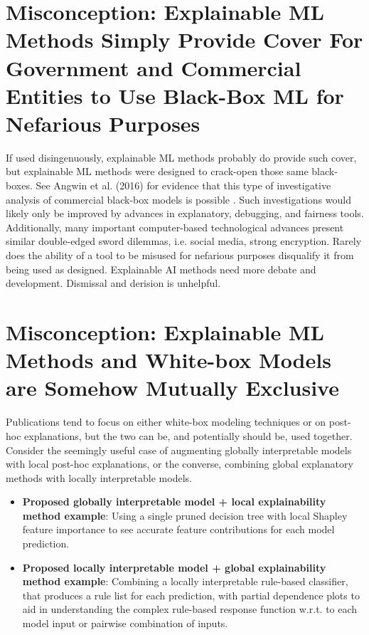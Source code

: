\documentclass{article}
\begin{document}
\section{Misconception: Explainable ML Methods Simply Provide Cover For Government and Commercial Entities to Use Black-Box ML for Nefarious Purposes}

If used disingenuously, explainable ML methods probably do provide such cover, but explainable ML methods were designed to crack-open those same black-boxes. See Angwin et al. (2016) for evidence that this type of investigative analysis of commercial black-box models is possible \cite{angwin16}. Such investigations would likely only be improved by advances in explanatory, debugging, and fairness tools. \\

Additionally, many important computer-based technological advances present similar double-edged sword dilemmas, i.e. social media, strong encryption. Rarely does the ability of a tool to be misused for nefarious purposes  disqualify it from being used as designed. Explainable AI methods need more debate and development. Dismissal and derision is unhelpful.


\section{Misconception: Explainable ML Methods and White-box Models are Somehow Mutually Exclusive}

Publications tend to focus on either white-box modeling techniques or on post-hoc explanations, but the two can be, and potentially should be, used together. Consider the seemingly useful case of augmenting globally interpretable models with local post-hoc explanations, or the converse, combining global explanatory methods with locally interpretable models.

\begin{itemize}
\item \textbf{Proposed globally interpretable model + local explainability method example}: Using a single pruned decision tree with local Shapley feature importance to see accurate feature contributions for each model prediction.
\item \textbf{Proposed locally interpretable model + global explainability method example}: Combining a locally interpretable rule-based classifier, that produces a rule list for each prediction, with partial dependence plots to aid in understanding the complex rule-based response function w.r.t. to each model input or pairwise combination of inputs.  
\end{itemize}
\end{document}
